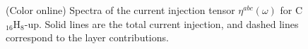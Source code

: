 \documentclass[pss]{wiley2sp} %
\begin{document}
\begin{figure}[b]
\centering
{}\\
\\
\caption{(Color online) Spectra of the current injection tensor
{$\eta^{abc}(\omega)$} for C$_{16}$H$_{8}$-up. Solid lines are the total
current injection, and dashed lines correspond to the layer
contributions.\label{fig:up-eta}}
\end{figure}
\end{document}
